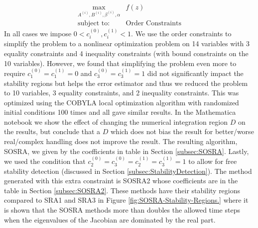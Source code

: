 \documentclass{article}
\begin{document}
\begin{align}
\max_{A^{(i)},B^{(i)},\beta^{(i)},\alpha} & f(z)\label{eq:SRA_maximize}\\
\text{subject to: } & \text{Order Constraints}\nonumber
\end{align}
In all cases we impose $0<c_{i}^{(0)},c_{i}^{(1)}<1$. We use the
order constraints to simplify the problem to a nonlinear optimization
problem on 14 variables with 3 equality constraints and 4 inequality
constraints (with bound constraints on the 10 variables). However,
we found that simplifying the problem even more to require $c_{1}^{(0)}=c_{1}^{(1)}=0$
and $c_{3}^{(0)}=c_{3}^{(1)}=1$ did not significantly impact the
stability regions but helps the error estimator and thus we reduced
the problem to 10 variables, 3 equality constraints, and 2 inequality
constraints. This was optimized using the COBYLA local optimization
algorithm \cite{RN3788,RN3789} with randomized initial conditions
100 times and all gave similar results. In the Mathematica notebook
we show the effect of changing the numerical integration region $D$
on the results, but conclude that a $D$ which does not bias the result
for better/worse real/complex handling does not improve the result.
The resulting algorithm, SOSRA, we given by the coefficients in table
in Section \ref{subsec:SOSRA}. Lastly, we used the condition that
$c_{2}^{(0)}=c_{3}^{(0)}=c_{2}^{(1)}=c_{3}^{(1)}=1$ to allow for
free stability detection (discussed in Section \ref{subsec:StabilityDetection}).
The method generated with this extra constraint is SOSRA2 whose coefficients
are in the table in Section \ref{subsec:SOSRA2}. These methods have
their stability regions compared to SRA1 and SRA3 in Figure \ref{fig:SOSRA-Stability-Regions.}
where it is shown that the SOSRA methods more than doubles the allowed
time steps when the eigenvalues of the Jacobian are dominated by the
real part.
\end{document}
